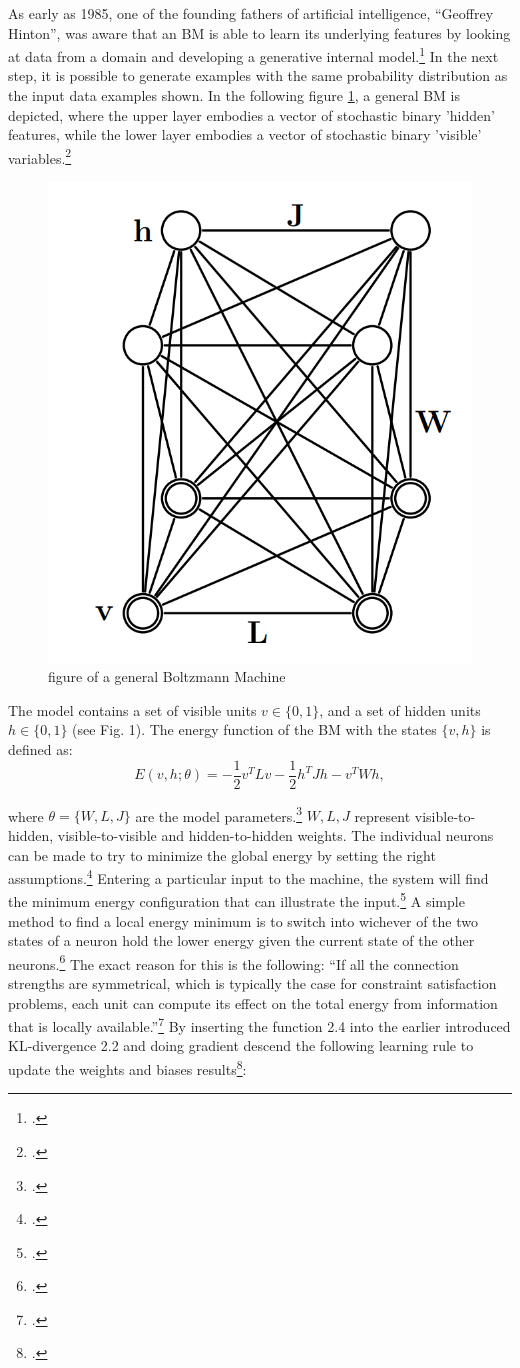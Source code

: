 As early as 1985, one of the founding fathers of artificial intelligence, ``Geoffrey Hinton'', was aware that an \ac{BM} is able to learn its underlying features by looking at data from a domain and developing a generative internal model.\footcite[Vgl.][148]{ackleyLearningAlgorithmBoltzmann1985}
In the next step, it is possible to generate examples with the same probability distribution as the input data examples shown.
In the following figure \ref{fig1}, a general \ac{BM} is depicted, where the upper layer embodies a vector of stochastic binary 'hidden' features, while the lower layer embodies a vector of stochastic binary 'visible' variables.\footcite[Vgl.][449]{salakhutdinovDeepBoltzmannMachines2009}

\begin{figure}[H]
    \centering
    \includegraphics[width=0.25\linewidth]{graphics/General_BM.png}
    \caption{figure of a general Boltzmann Machine}
    \label{fig1}
\end{figure}
The model contains a set of visible units \( v \in \{0, 1\} \), and a set of hidden units \( h \in \{0, 1\} \) (see Fig. 1). The energy function of the \ac{BM} with the states \( \{v, h\} \) is defined as:
\begin{equation}
E(v, h; \theta) = -\frac{1}{2} v^T L v - \frac{1}{2} h^T J h - v^T W h,
\end{equation}

where \( \theta = \{W, L, J\} \) are the model parameters.\footcite[Vgl.][448]{salakhutdinovDeepBoltzmannMachines2009}
\( W, L, J \) represent visible-to-hidden, visible-to-visible and hidden-to-hidden weights.
The individual neurons can be made to try to minimize the global energy by setting the right assumptions.\footcite[Vgl.][150]{ackleyLearningAlgorithmBoltzmann1985}
Entering a particular input to the machine, the system will find the minimum energy configuration that can illustrate the input.\footcite[Vgl.][150]{ackleyLearningAlgorithmBoltzmann1985}
A simple method to find a local energy minimum is to switch into wichever of the two states of a neuron hold the lower energy given the current state of the other neurons.\footcite[Vgl.][110]{fahlmanMassivelyParallelArchitectures1983}  
The exact reason for this is the following: ``If all the connection strengths are
symmetrical, which is typically the case for constraint satisfaction
problems, each unit can compute its effect on the total energy from
information that is locally available.''\footcite[110]{fahlmanMassivelyParallelArchitectures1983}  
By inserting the function 2.4 into the earlier introduced KL-divergence 2.2 and doing gradient descend the following learning rule to update the weights and biases results\footcite[Vgl.][5]{hintonPracticalGuideTraining2012}:

